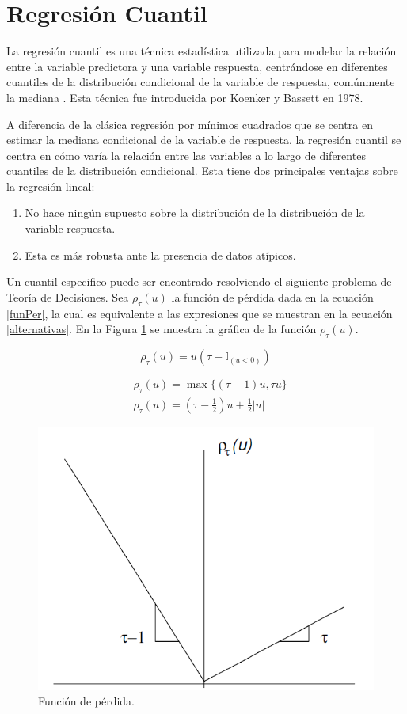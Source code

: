 \section{Regresión Cuantil}
    
    La regresión cuantil es una técnica estadística utilizada para modelar la relación entre la variable predictora y una variable respuesta, centrándose en diferentes cuantiles de la distribución condicional de la variable de respuesta, comúnmente la mediana \cite{cuantilReg}. Esta técnica fue introducida por Koenker y Bassett en 1978.  
    
    A diferencia de la clásica regresión por mínimos cuadrados que se centra en estimar la mediana condicional de la variable de respuesta, la regresión cuantil se centra en cómo varía la relación entre las variables a lo largo de diferentes cuantiles de la distribución condicional. Esta tiene dos principales ventajas sobre la regresión lineal:
    
    \begin{enumerate}
        \item No hace ningún supuesto sobre la distribución de la distribución de la variable respuesta.
        \item Esta es más robusta ante la presencia de datos atípicos. 
    \end{enumerate}

    Un cuantil especifico puede ser encontrado resolviendo el siguiente problema de Teoría de Decisiones. Sea $\rho_\tau(u)$ la función de pérdida dada en la ecuación \eqref{funPer}, la cual es equivalente a las expresiones que se muestran en la ecuación \eqref{alternativas}. En la Figura \ref{fig:perdida} se muestra la gráfica de la función $\rho_\tau(u)$.
    
    \begin{equation}\label{funPer}
    \rho_\tau(u)= u\left(\tau-\mathbb{I}_{(u<0)}\right)
    \end{equation}

    \begin{equation}\label{alternativas}
    \begin{split}
        &\rho_\tau(u)=\max \{(\tau-1) u, \tau u\}\\
        &\rho_\tau(u)=\left(\tau-\frac{1}{2}\right) u+\frac{1}{2}|u|
    \end{split}
    \end{equation}
    
    \begin{figure}[H]
        \centering
        \includegraphics[width = 0.5 \textwidth]{Imagenes/perdida.png}
        \caption{Función de pérdida.}
        \label{fig:perdida}
    \end{figure}
    
